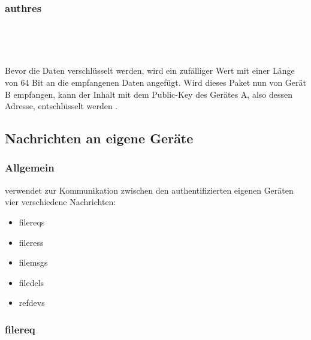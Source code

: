\subsubsection{\gls{authres}}
\messagestart
	 \\
	
	\begin{rightwordgroup}{\isprotomsgtype}
	\end{rightwordgroup} \\
	
	\begin{rightwordgroup}{\isprotomsgdata}
	\end{rightwordgroup}
	
Bevor die Daten verschlüsselt werden, wird ein zufälliger Wert mit einer Länge von 64 Bit an die empfangenen Daten angefügt.
Wird dieses Paket nun von Gerät B empfangen, kann der Inhalt mit dem Public-Key des Gerätes A, also dessen Adresse, entschlüsselt werden .
		
\subsection{Nachrichten an eigene Geräte}
\subsubsection{Allgemein}
\sblitg verwendet zur Kommunikation zwischen den authentifizierten eigenen Geräten vier verschiedene Nachrichten:
\begin{itemize}
	\item \gls{filereq}s
	\item \gls{fileres}s
	\item \gls{filemsg}s
	\item \gls{filedel}s
	\item \gls{refdev}s
\end{itemize}

\subsubsection{\gls{filereq}} \label{Dateianfrage}
\messagestart
	 \\
	
	\begin{rightwordgroup}{\isprotomsgtype}
	\end{rightwordgroup} \\
	
